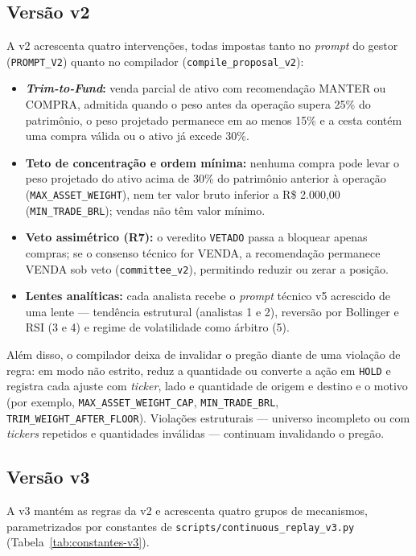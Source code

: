 \documentclass{eic-bcc-tcc}
\begin{document}
\subsection{Versão v2}

A v2 acrescenta quatro intervenções, todas impostas tanto no \textit{prompt} do gestor (\texttt{PROMPT\_V2}) quanto no compilador (\texttt{compile\_proposal\_v2}):

\begin{itemize}
  \item \textbf{\textit{Trim-to-Fund}:} venda parcial de ativo com recomendação MANTER ou COMPRA, admitida quando o peso antes da operação supera 25\% do patrimônio, o peso projetado permanece em ao menos 15\% e a cesta contém uma compra válida ou o ativo já excede 30\%.
  \item \textbf{Teto de concentração e ordem mínima:} nenhuma compra pode levar o peso projetado do ativo acima de 30\% do patrimônio anterior à operação (\texttt{MAX\_ASSET\_WEIGHT}), nem ter valor bruto inferior a R\$ 2.000,00 (\texttt{MIN\_TRADE\_BRL}); vendas não têm valor mínimo.
  \item \textbf{Veto assimétrico (R7):} o veredito \texttt{VETADO} passa a bloquear apenas compras; se o consenso técnico for VENDA, a recomendação permanece VENDA sob veto (\texttt{committee\_v2}), permitindo reduzir ou zerar a posição.
  \item \textbf{Lentes analíticas:} cada analista recebe o \textit{prompt} técnico v5 acrescido de uma lente --- tendência estrutural (analistas 1 e 2), reversão por Bollinger e RSI (3 e 4) e regime de volatilidade como árbitro (5).
\end{itemize}

Além disso, o compilador deixa de invalidar o pregão diante de uma violação de regra: em modo não estrito, reduz a quantidade ou converte a ação em \texttt{HOLD} e registra cada ajuste com \textit{ticker}, lado e quantidade de origem e destino e o motivo (por exemplo, \texttt{MAX\_ASSET\_WEIGHT\_CAP}, \texttt{MIN\_TRADE\_BRL}, \texttt{TRIM\_WEIGHT\_AFTER\_FLOOR}). Violações estruturais --- universo incompleto ou com \textit{tickers} repetidos e quantidades inválidas --- continuam invalidando o pregão.

\subsection{Versão v3}

A v3 mantém as regras da v2 e acrescenta quatro grupos de mecanismos, parametrizados por constantes de \texttt{scripts/continuous\_replay\_v3.py} (Tabela~\ref{tab:constantes-v3}).
\end{document}
